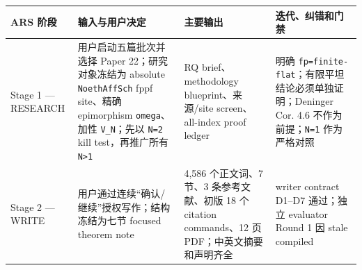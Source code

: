 \documentclass[12pt,a4paper]{article}
\begin{document}
\begin{longtable}[]{@{}llll@{}}
\toprule
\begin{minipage}[b]{0.22\columnwidth}\raggedright
ARS 阶段\strut
\end{minipage} & \begin{minipage}[b]{0.22\columnwidth}\raggedright
输入与用户决定\strut
\end{minipage} & \begin{minipage}[b]{0.22\columnwidth}\raggedright
主要输出\strut
\end{minipage} & \begin{minipage}[b]{0.22\columnwidth}\raggedright
迭代、纠错和门禁\strut
\end{minipage}\tabularnewline
\midrule
\endhead
\begin{minipage}[t]{0.22\columnwidth}\raggedright
Stage 1 --- RESEARCH\strut
\end{minipage} & \begin{minipage}[t]{0.22\columnwidth}\raggedright
用户启动五篇批次并选择 Paper 22；研究对象冻结为 absolute
\texttt{NoethAffSch} fppf site、精确 epimorphism \texttt{omega}、加性
\texttt{V\_N}；先以 \texttt{N=2} kill test，再推广所有
\texttt{N\textgreater{}1}\strut
\end{minipage} & \begin{minipage}[t]{0.22\columnwidth}\raggedright
RQ brief、methodology blueprint、来源/site screen、all-index proof
ledger\strut
\end{minipage} & \begin{minipage}[t]{0.22\columnwidth}\raggedright
明确 \texttt{fp=finite-flat}；有限平坦结论必须单独证明；Deninger Cor.
4.6 不作为前提；\texttt{N=1} 作为严格对照\strut
\end{minipage}\tabularnewline
\begin{minipage}[t]{0.22\columnwidth}\raggedright
Stage 2 --- WRITE\strut
\end{minipage} & \begin{minipage}[t]{0.22\columnwidth}\raggedright
用户通过连续``确认/继续''授权写作；结构冻结为七节 focused theorem
note\strut
\end{minipage} & \begin{minipage}[t]{0.22\columnwidth}\raggedright
4,586 个正文词、7 节、3 条参考文献、初版 18 个 citation commands、12 页
PDF；中英文摘要和声明齐全\strut
\end{minipage} & \begin{minipage}[t]{0.22\columnwidth}\raggedright
writer contract D1--D7 通过；独立 evaluator Round 1 因 stale compiled

\end{minipage}
\end{longtable}
\end{document}
